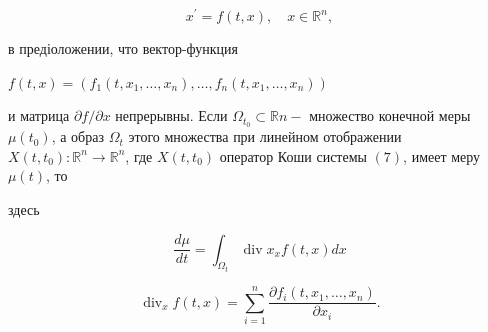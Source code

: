 \documentclass[10pt]{article}
\begin{document}
\[

x^{\prime}=f(t, x), \quad x \in \mathbb{R}^{n},

\]



в предіоложении, что вектор-функция



$f(t, x)=\left(f_{1}\left(t, x_{1}, \ldots, x_{n}\right), \ldots, f_{n}\left(t, x_{1}, \ldots, x_{n}\right)\right)$



и матрица $\partial f / \partial x$ непрерывны. Если $\Omega_{t_{0}} \subset \mathbb{R} n-$ множество конечной меры $\mu\left(t_{0}\right)$, а образ $\Omega_{t}$ этого множества при линейном отображении $X\left(t, t_{0}\right): \mathbb{R}^{n} \rightarrow \mathbb{R}^{n}$, где $X\left(t, t_{0}\right)$ оператор Коши системы $(7)$, имеет меру $\mu(t)$, то



здесь



\[

\frac{d \mu}{d t}=\int_{\Omega_{t}} \operatorname{div} x_{x} f(t, x) d x

\]



\[

\operatorname{div}_{x} f(t, x)=\sum_{i=1}^{n} \frac{\partial f_{i}\left(t, x_{1}, \ldots, x_{n}\right)}{\partial x_{i}} .

\]
\end{document}
